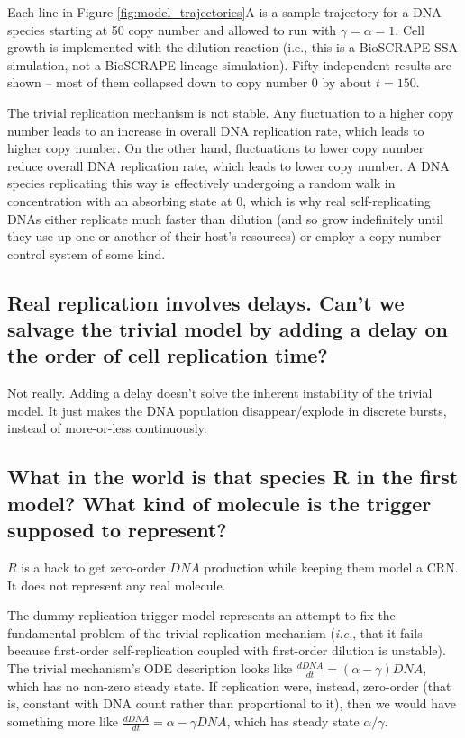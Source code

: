 \documentclass[preprint,12pt]{oldplainarticle}
\begin{document}
Each line in Figure \ref{fig:model_trajectories}A is a sample trajectory for a DNA species starting at 50 copy number and allowed to run with $\gamma = \alpha = 1$. Cell growth is implemented with the dilution reaction (i.e., this is a BioSCRAPE SSA simulation, not a BioSCRAPE lineage simulation). Fifty independent results are shown -- most of them collapsed down to copy number 0 by about $t=150$. 

The trivial replication mechanism is not stable. Any fluctuation to a higher copy number leads to an increase in overall DNA replication rate, which leads to higher copy number. On the other hand, fluctuations to lower copy number reduce overall DNA replication rate, which leads to lower copy number. A DNA species replicating this way is effectively undergoing a random walk in concentration with an absorbing state at 0, which is why real self-replicating DNAs either replicate much faster than dilution (and so grow indefinitely until they use up one or another of their host's resources) or employ a copy number control system of some kind. 

\subsection{Real replication involves delays. Can't we salvage the trivial model by adding a delay on the order of cell replication time?}

Not really. Adding a delay doesn't solve the inherent instability of the trivial model. It just makes the DNA population disappear/explode in discrete bursts, instead of more-or-less continuously.

\subsection{What in the world is that species R in the first model? What kind of molecule is the trigger supposed to represent?}

$R$ is a hack to get zero-order $DNA$ production while keeping them model a CRN. It does not represent any real molecule.

The dummy replication trigger model represents an attempt to fix the fundamental problem of the trivial replication mechanism (\emph{i.e.}, that it fails because first-order self-replication coupled with first-order dilution is unstable). The trivial mechanism's ODE description looks like $\frac{dDNA}{dt} = (\alpha - \gamma) DNA$, which has no non-zero steady state. If replication were, instead, zero-order (that is, constant with DNA count rather than proportional to it), then we would have something more like $\frac{dDNA}{dt} = \alpha - \gamma DNA$, which has steady state $\alpha / \gamma$. 
\end{document}
